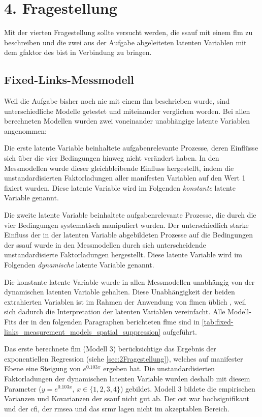 \documentclass[11pt, twoside, a4paper]{book}		%
\begin{document}
\section{4. Fragestellung \label{sec:4Fragestellung}}

Mit der vierten Fragestellung sollte versucht werden, die \gls{ssauf} mit einem \gls{flm} zu beschreiben und die zwei aus der Aufgabe abgeleiteten latenten Variablen mit dem \gls{gfaktor} des \gls{bist} in Verbindung zu bringen.


\subsection{Fixed-Links-Messmodell \label{subsec:spatial_suppression_fixed_links_messmodell}}

Weil die Aufgabe bisher noch nie mit einem \gls{flm} beschrieben wurde, sind unterschiedliche Modelle getestet und miteinander verglichen worden. Bei allen berechneten Modellen wurden zwei voneinander unabhängige latente Variablen angenommen: 

Die erste latente Variable beinhaltete aufgabenrelevante Prozesse, deren Einflüsse sich über die vier Bedingungen hinweg nicht verändert haben. In den Messmodellen wurde dieser gleichbleibende Einfluss hergestellt, indem die unstandardisierten Faktorladungen aller manifesten Variablen auf den Wert 1 fixiert wurden. Diese latente Variable wird im Folgenden \textit{konstante} latente Variable genannt. 

Die zweite latente Variable beinhaltete aufgabenrelevante Prozesse, die durch die vier Bedingungen systematisch manipuliert wurden. Der unterschiedlich starke Einfluss der in der latenten Variable abgebildeten Prozesse auf die Bedingungen der \gls{ssauf} wurde in den Messmodellen durch sich unterscheidende unstandardisierte Faktorladungen hergestellt. Diese latente Variable wird im Folgenden \textit{dynamische} latente Variable genannt.

Die konstante latente Variable wurde in allen Messmodellen unabhängig von der dynamischen latenten Variable gehalten. Diese Unabhängigkeit der beiden extrahierten Variablen ist im Rahmen der Anwendung von \gls{flm}en üblich \citep[z.B.][]{Wagner2014, Schweizer2007, Wang2015}, weil sich dadurch die Interpretation der latenten Variablen vereinfacht.
Alle Modell-Fits der in den folgenden Paragraphen berichteten \gls{flm}e sind in \autoref{tab:fixed-links_measurement_models_spatial_suppression} aufgeführt.

Das erste berechnete \gls{flm} (Modell 3) berücksichtige das Ergebnis der exponentiellen Regression (siehe \autoref{sec:2Fragestellung}), welches auf manifester Ebene eine Steigung von $e^{0.103x}$ ergeben hat. Die unstandardisierten Faktorladungen der dynamischen latenten Variable wurden deshalb mit diesem Parameter ($y=e^{0.103x},\,x\in\{1, 2, 3, 4\}$) gebildet. Modell 3 bildete die empirischen Varianzen und Kovarianzen der \gls{ssauf} nicht gut ab. Der \gls{cst} war hochsignifikant und der \gls{cfi}, der \gls{rmsea} und das \gls{srmr} lagen nicht im akzeptablen Bereich.
\end{document}

